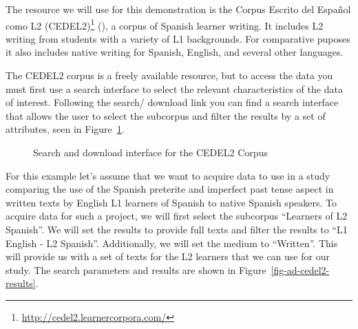 \documentclass[
  letterpaper,
]{latex/krantz}
\theoremstyle{definition}
\theoremstyle{remark}
\DeclareRobustCommand{\href}[2]{#2\footnote{\url{#1}}}
\begin{document}
The resource we will use for this demonstration is the
\href{http://cedel2.learnercorpora.com/}{Corpus Escrito del Español como
L2 (CEDEL2)} (), a corpus of
Spanish learner writing. It includes L2 writing from students with a
variety of L1 backgrounds. For comparative puposes it also includes
native writing for Spanish, English, and several other languages.

The CEDEL2 corpus is a freely available resource, but to access the data
you must first use a search interface to select the relevant
characteristics of the data of interest. Following the search/ download
link you can find a search interface that allows the user to select the
subcorpus and filter the results by a set of attributes, seen in
Figure~\ref{fig-ad-cedel2-search}.

\begin{figure}[H]


\caption{\label{fig-ad-cedel2-search}Search and download interface for
the CEDEL2 Corpus}

\end{figure}%

For this example let's assume that we want to acquire data to use in a
study comparing the use of the Spanish preterite and imperfect past
tense aspect in written texts by English L1 learners of Spanish to
native Spanish speakers. To acquire data for such a project, we will
first select the subcorpus ``Learners of L2 Spanish''. We will set the
results to provide full texts and filter the results to ``L1 English -
L2 Spanish''. Additionally, we will set the medium to ``Written''. This
will provide us with a set of texts for the L2 learners that we can use
for our study. The search parameters and results are shown in
Figure~\ref{fig-ad-cedel2-results}.
\end{document}
